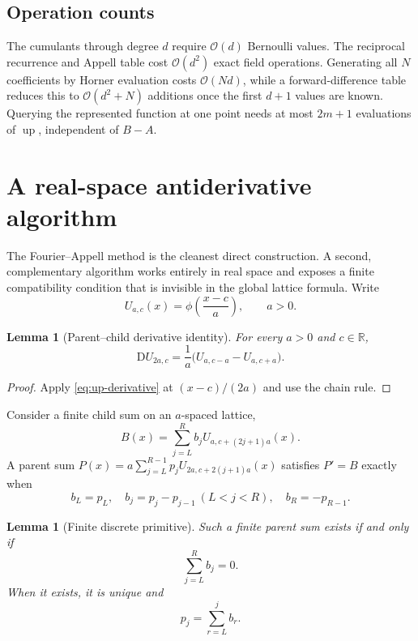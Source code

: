 \documentclass[11pt,oneside]{article}
\newtheorem{lemma}[theorem]{Lemma}
\theoremstyle{definition}
\theoremstyle{remark}
\newcommand{\R}{\mathbb R}
\newcommand{\Up}{\operatorname{up}}
\newcommand{\D}{\mathrm D}
\newcommand{\bigO}{\mathcal O}
\begin{document}
\subsection{Operation counts}

The cumulants through degree \(d\) require \(\bigO(d)\) Bernoulli values.
The reciprocal recurrence and Appell table cost \(\bigO(d^2)\) exact field
operations.  Generating all \(N\) coefficients by Horner evaluation costs
\(\bigO(Nd)\), while a forward-difference table reduces this to
\(\bigO(d^2+N)\) additions once the first \(d+1\) values are known.  Querying
the represented function at one point needs at most \(2m+1\) evaluations of
\(\Up\), independent of \(B-A\).

\section{A real-space antiderivative algorithm}
\label{sec:antiderivative}

The Fourier--Appell method is the cleanest direct construction.  A second,
complementary algorithm works entirely in real space and exposes a finite
compatibility condition that is invisible in the global lattice formula.
Write
\[
 U_{a,c}(x)=\phi\!\left(\frac{x-c}{a}\right),\qquad a>0.
\]

\begin{lemma}[Parent--child derivative identity]
\label{lem:parent-child}
For every \(a>0\) and \(c\in\R\),
\begin{equation}
 \D U_{2a,c}
 =\frac1a\bigl(U_{a,c-a}-U_{a,c+a}\bigr).
 \label{eq:parent-child}
\end{equation}
\end{lemma}

\begin{proof}
Apply \eqref{eq:up-derivative} at \((x-c)/(2a)\) and use the chain rule.
\end{proof}

Consider a finite child sum on an \(a\)-spaced lattice,
\[
 B(x)=\sum_{j=L}^{R}b_jU_{a,c+(2j+1)a}(x).
\]
A parent sum \(P(x)=a\sum_{j=L}^{R-1}p_jU_{2a,c+2(j+1)a}(x)\) satisfies
\(P'=B\) exactly when
\[
 b_L=p_L,
 \quad b_j=p_j-p_{j-1}\ (L<j<R),
 \quad b_R=-p_{R-1}.
\]

\begin{lemma}[Finite discrete primitive]
\label{lem:discrete-primitive}
Such a finite parent sum exists if and only if
\begin{equation}
 \sum_{j=L}^{R}b_j=0.
 \label{eq:zero-sum-condition}
\end{equation}
When it exists, it is unique and
\begin{equation}
 p_j=\sum_{r=L}^{j}b_r.
 \label{eq:prefix-primitive}
\end{equation}
\end{lemma}
\end{document}
